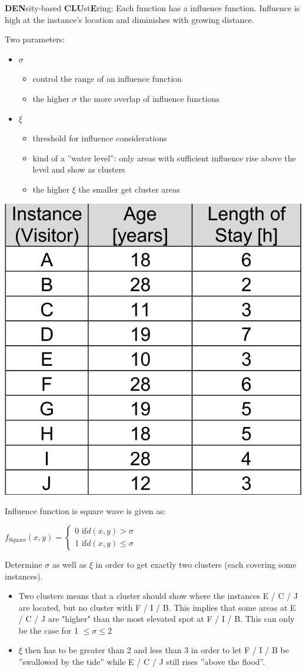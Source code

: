 \begin{breakbox}
\textbf{DEN}sity-based \textbf{CLU}st\textbf{E}ring: Each function has a influence function. Influence is high at the instance's location and diminishes with growing distance.

Two parameters:
\begin{itemize}
	\item $\sigma$
		\begin{itemize}
			\item control the range of an influence function
			\item the higher $\sigma$ the more overlap of influence functions
		\end{itemize}
	\item $\xi$
		\begin{itemize}
			\item threshold for influence considerations
			\item  kind of a ''water level'': only areas with
sufficient influence rise above the level and show as clusters
			\item the higher $\xi$ the smaller get cluster areas
		\end{itemize}
\end{itemize}

\begin{center}
	\includegraphics[width=.07\textwidth]{slides_images/denclue_data_table}
\end{center}

Influence function is square wave is given as:

\begin{center}
	$f_{\text{Square}} (x,y) = \begin{cases} 
    	  0 \text{ if} d(x,y) > \sigma \\
	      1 \text{ if} d(x,y) \leq \sigma
	   \end{cases}$
\end{center}

Determine $\sigma$ as well as $\xi$ in order to get exactly two clusters (each covering some instances).

\begin{itemize}
	\item Two clusters means that a cluster should show where the instances E / C / J are located, but no cluster with F / I / B. This implies that some areas at E / C / J are "higher" than the most elevated spot at F / I / B. This can only be the case for 1 $\leq \sigma \le 2$
	\item $\xi$ then has to be greater than 2 and less than 3 in order to let F / I / B be ''swallowed by the
tide'' while E / C / J still rises ''above the flood''.
\end{itemize}


\end{breakbox}
